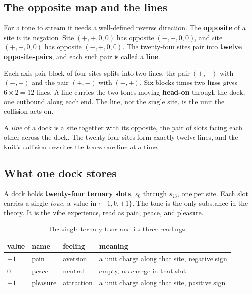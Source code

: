 \subsection{The opposite map and the lines}

For a tone to stream it needs a well-defined reverse direction. The \textbf{opposite} of a site is its negation. Site $(+,+,0,0)$ has opposite $(-,-,0,0)$, and site $(+,-,0,0)$ has opposite $(-,+,0,0)$. The twenty-four sites pair into \textbf{twelve opposite-pairs}, and each such pair is called a \textbf{line}.

Each axis-pair block of four sites splits into two lines, the pair $(+,+)$ with $(-,-)$ and the pair $(+,-)$ with $(-,+)$. Six blocks times two lines gives $6 \times 2 = 12$ lines. A line carries the two tones moving \textbf{head-on} through the dock, one outbound along each end. The line, not the single site, is the unit the collision acts on.

\begin{definition}[Line]
A \emph{line} of a dock is a site together with its opposite, the pair of slots facing each other across the dock. The twenty-four sites form exactly twelve lines, and the knit's collision rewrites the tones one line at a time.
\end{definition}

\subsection{What one dock stores}

A dock holds \textbf{twenty-four ternary slots}, $s_0$ through $s_{23}$, one per site. Each slot carries a single \emph{tone}, a value in $\{-1, 0, +1\}$. The tone is the only substance in the theory. It is the vibe experience, read as pain, peace, and pleasure.

\begin{table}[ht]
\centering
\begin{tabular}{@{}llll@{}}
\toprule
value & name & feeling & meaning \\
\midrule
$-1$ & pain & aversion & a unit charge along that site, negative sign \\
$0$ & peace & neutral & empty, no charge in that slot \\
$+1$ & pleasure & attraction & a unit charge along that site, positive sign \\
\bottomrule
\end{tabular}
\caption{The single ternary tone and its three readings.}
\label{tab:the-tone}
\end{table}

